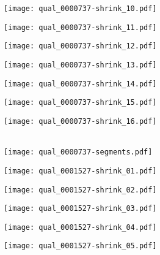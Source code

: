 \documentclass[10pt,twocolumn,letterpaper]{article}
\begin{document}
\begin{figure*}[t]
 \begin{minipage}{0.058\textwidth} \centering \texttt{[image: qual\_0000737-shrink\_10.pdf]} \end{minipage}
 \begin{minipage}{0.058\textwidth} \centering \texttt{[image: qual\_0000737-shrink\_11.pdf]} \end{minipage}
 \begin{minipage}{0.058\textwidth} \centering \texttt{[image: qual\_0000737-shrink\_12.pdf]} \end{minipage}
 \begin{minipage}{0.058\textwidth} \centering \texttt{[image: qual\_0000737-shrink\_13.pdf]} \end{minipage}
 \begin{minipage}{0.058\textwidth} \centering \texttt{[image: qual\_0000737-shrink\_14.pdf]} \end{minipage}
 \begin{minipage}{0.058\textwidth} \centering \texttt{[image: qual\_0000737-shrink\_15.pdf]} \end{minipage}
 \begin{minipage}{0.058\textwidth} \centering \texttt{[image: qual\_0000737-shrink\_16.pdf]} \end{minipage}
 \\ \vspace{2mm}
 \texttt{[image: qual\_0000737-segments.pdf]}
 \\ \vspace{2mm}
\begin{minipage}{0.058\textwidth} \centering \texttt{[image: qual\_0001527-shrink\_01.pdf]} \end{minipage}
 \begin{minipage}{0.058\textwidth} \centering \texttt{[image: qual\_0001527-shrink\_02.pdf]} \end{minipage}
 \begin{minipage}{0.058\textwidth} \centering \texttt{[image: qual\_0001527-shrink\_03.pdf]} \end{minipage}
 \begin{minipage}{0.058\textwidth} \centering \texttt{[image: qual\_0001527-shrink\_04.pdf]} \end{minipage}
 \begin{minipage}{0.058\textwidth} \centering \texttt{[image: qual\_0001527-shrink\_05.pdf]} \end{minipage}

\end{figure*}
\end{document}
